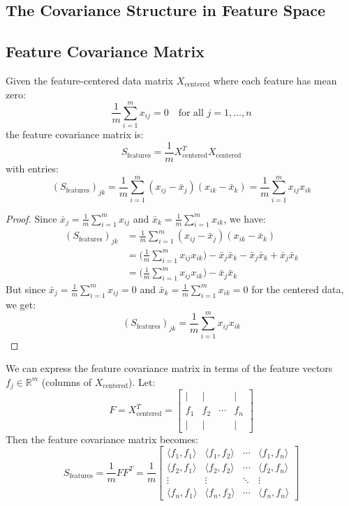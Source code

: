 \begin{notechapter}
\section{The Covariance Structure in Feature Space}

\subsection{Feature Covariance Matrix}

\begin{definition}
Given the feature-centered data matrix $X_{\text{centered}}$ where each feature has mean zero:
\[
\frac{1}{m}\sum_{i=1}^m x_{ij} = 0 \quad \text{for all } j = 1,\dots,n
\]
the feature covariance matrix is:
\[
S_{\text{features}} = \frac{1}{m}X_{\text{centered}}^T X_{\text{centered}}
\]
with entries:
\[
(S_{\text{features}})_{jk} = \frac{1}{m}\sum_{i=1}^m (x_{ij} - \bar{x}_j)(x_{ik} - \bar{x}_k) = \frac{1}{m}\sum_{i=1}^m x_{ij}x_{ik}
\]
\end{definition}

\begin{proof}
Since $\bar{x}_j = \frac{1}{m}\sum_{i=1}^m x_{ij}$ and $\bar{x}_k = \frac{1}{m}\sum_{i=1}^m x_{ik}$, we have:
\begin{align*}
(S_{\text{features}})_{jk} &= \frac{1}{m}\sum_{i=1}^m (x_{ij} - \bar{x}_j)(x_{ik} - \bar{x}_k) \\
&= \Big(\frac{1}{m}\sum_{i=1}^m x_{ij}x_{ik}\Big) - \bar{x}_j\bar{x}_k - \bar{x}_j\bar{x}_k + \bar{x}_j\bar{x}_k \\
&= \Big(\frac{1}{m}\sum_{i=1}^m x_{ij}x_{ik}\Big) - \bar{x}_j\bar{x}_k
\end{align*}
But since $\bar{x}_j = \frac{1}{m}\sum_{i=1}^m x_{ij} = 0$ and $\bar{x}_k = \frac{1}{m}\sum_{i=1}^m x_{ik} = 0$ for the centered data, we get:
\[
(S_{\text{features}})_{jk} = \frac{1}{m}\sum_{i=1}^m x_{ij}x_{ik}
\]
\end{proof}

\begin{remark}
We can express the feature covariance matrix in terms of the feature vectors $f_j \in \mathbb{R}^m$ (columns of $X_{\text{centered}}$). Let:
\[
F = X_{\text{centered}}^T = \begin{bmatrix}
\mid & \mid & & \mid \\
f_1 & f_2 & \cdots & f_n \\
\mid & \mid & & \mid
\end{bmatrix}
\]
Then the feature covariance matrix becomes:
\[
S_{\text{features}} = \frac{1}{m}FF^T = \frac{1}{m}
\begin{bmatrix}
\langle f_1, f_1 \rangle & \langle f_1, f_2 \rangle & \cdots & \langle f_1, f_n \rangle \\
\langle f_2, f_1 \rangle & \langle f_2, f_2 \rangle & \cdots & \langle f_2, f_n \rangle \\
\vdots & \vdots & \ddots & \vdots \\
\langle f_n, f_1 \rangle & \langle f_n, f_2 \rangle & \cdots & \langle f_n, f_n \rangle
\end{bmatrix}
\]


\end{remark}
\end{notechapter}
